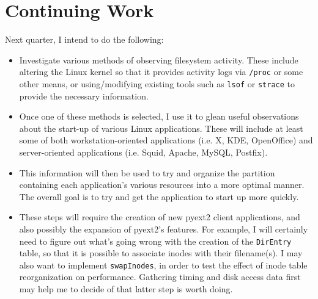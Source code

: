 \documentclass[10pt]{article}
\begin{document}
\section{Continuing Work}

Next quarter, I intend to do the following:
\begin{itemize}
 \item Investigate various methods of observing filesystem activity. These include altering the Linux kernel so that it provides activity logs via \texttt{/proc} or some other means, or using/modifying existing tools such as \texttt{lsof} or \texttt{strace} to provide the necessary information.
 \item Once one of these methods is selected, I use it to glean useful observations about the start-up of various Linux applications. These will include at least some of both workstation-oriented applications (i.e. X, KDE, OpenOffice) and server-oriented applications (i.e. Squid, Apache, MySQL, Postfix).
 \item This information will then be used to try and organize the partition containing each application's various resources into a more optimal manner. The overall goal is to try and get the application to start up more quickly.
 \item These steps will require the creation of new pyext2 client applications, and also possibly the expansion of pyext2's features. For example, I will certainly need to figure out what's going wrong with the creation of the \texttt{DirEntry} table, so that it is possible to associate inodes with their filename(s). I may also want to implement \texttt{swapInodes}, in order to test the effect of inode table reorganization on performance. Gathering timing and disk access data first may help me to decide of that latter step is worth doing.
\end{itemize}
\end{document}
